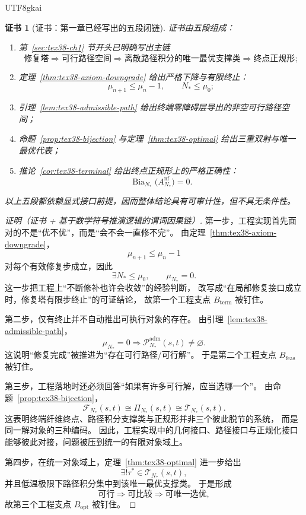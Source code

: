 \documentclass[12pt]{article}
\newtheorem{Certificate}{证书}[section]
\newcommand{\Bia}{\operatorname{Bia}}
\begin{document}
\begin{CJK*}{UTF8}{gkai}
\begin{Certificate}[证书：第一章已经写出的五段闭链]
\label{cert:tex38-engineering-role}
证书由五段组成：
\begin{enumerate}
  \item 第~\ref{sec:tex38-ch1} 节开头已明确写出主链
  \[
    \text{修复塔}
    \Longrightarrow
    \text{可行路径空间}
    \Longrightarrow
    \text{离散路径积分的唯一最优支撑类}
    \Longrightarrow
    \text{终点正规形};
  \]
  \item 定理~\ref{thm:tex38-axiom-downgrade} 给出严格下降与有限终止：
  \[
    \mu_{n+1}\le\mu_n-1,\qquad N_\ast\le\mu_0;
  \]
  \item 引理~\ref{lem:tex38-admissible-path} 给出终端零障碍层导出的非空可行路径空间；
  \item 命题~\ref{prop:tex38-bijection} 与定理~\ref{thm:tex38-optimal} 给出三重双射与唯一最优代表；
  \item 推论~\ref{cor:tex38-terminal} 给出终点正规形上的严格正确性：
  \[
    \Bia_{N_\ast}\bigl(A_{N_\ast}^{\mathrm{nf}}\bigr)=0.
  \]
\end{enumerate}
以上五段都依赖显式接口前提，因而整体结论具有可审计性，但不具无条件性。
\end{Certificate}

\begin{proof}[证明（证书 + 基于数学符号推演逻辑的谓词因果链）]
第一步，工程实现首先面对的不是“优不优”，而是“会不会一直修不完”。
由定理~\ref{thm:tex38-axiom-downgrade}，
\[
  \mu_{n+1}\le\mu_n-1
\]
对每个有效修复步成立，因此
\[
  \exists N_\ast\le\mu_0,\qquad \mu_{N_\ast}=0.
\]
这一步把工程上“不断修补也许会收敛”的经验判断，
改写成“在局部修复接口成立时，修复塔有限步终止”的可证结论，
故第一个工程支点 $B_{\mathrm{term}}$ 被钉住。

第二步，仅有终止并不自动推出可执行对象的存在。
由引理~\ref{lem:tex38-admissible-path}，
\[
  \mu_{N_\ast}=0
  \Longrightarrow
  \mathcal{P}_{N_\ast}^{\mathrm{adm}}(s,t)\neq\varnothing.
\]
这说明“修复完成”被推进为“存在可行路径/可行解”。
于是第二个工程支点 $B_{\mathrm{feas}}$ 被钉住。

第三步，工程落地时还必须回答“如果有许多可行解，应当选哪一个”。
由命题~\ref{prop:tex38-bijection}，
\[
  \mathcal{F}_{N_\ast}(s,t)
  \cong
  \Pi_{N_\ast}(s,t)
  \cong
  \mathcal{T}_{N_\ast}(s,t).
\]
这表明终端纤维终点、路径积分支撑类与正规形并非三个彼此脱节的系统，
而是同一解对象的三种编码。
因此，工程实现中的几何接口、路径接口与正规化接口能够彼此对接，问题被压到统一的有限对象域上。

第四步，在统一对象域上，定理~\ref{thm:tex38-optimal} 进一步给出
\[
  \exists!\tau^\ast\in\mathcal{T}_{N_\ast}(s,t),
\]
并且低温极限下路径积分集中到该唯一最优支撑类。
于是形成
\[
  \text{可行}
  \Longrightarrow
  \text{可比较}
  \Longrightarrow
  \text{可唯一选优},
\]
故第三个工程支点 $B_{\mathrm{opt}}$ 被钉住。


\end{proof}
\end{CJK*}
\end{document}
